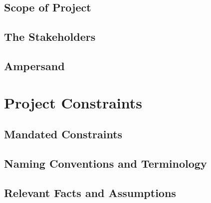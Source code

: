 \documentclass[12pt]{report}
\begin{document}
{\section{Scope of Project}\label{sec:ScopeProj}}

{\section{The Stakeholders}\label{sec:Stakeholders}}
{\section{Ampersand}\label{sec:AmpersandClient}}




\chapter{Project Constraints}\label{ch:Constraints}
\section{Mandated Constraints}\label{sec:Constraints}
\section{Naming Conventions and Terminology}\label{sec:Naming} 
\section{Relevant Facts and Assumptions}\label{sec:Assumptions}
\end{document}
